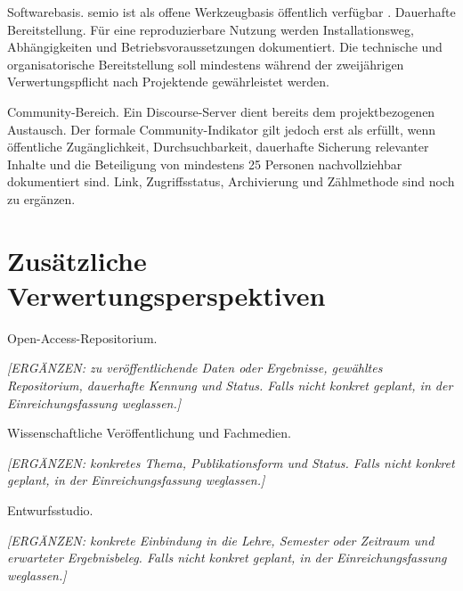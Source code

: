 \documentclass[type=zwischenbericht]{zukunftbau}
\begin{document}
Softwarebasis. semio ist als offene Werkzeugbasis öffentlich verfügbar \cite{saluz-semio-2025}.
Dauerhafte Bereitstellung. Für eine reproduzierbare Nutzung werden Installationsweg, Abhängigkeiten und Betriebsvoraussetzungen dokumentiert. Die technische und organisatorische Bereitstellung soll mindestens während der zweijährigen Verwertungspflicht nach Projektende gewährleistet werden.

Community-Bereich. Ein Discourse-Server dient bereits dem projektbezogenen Austausch. Der formale Community-Indikator gilt jedoch erst als erfüllt, wenn öffentliche Zugänglichkeit, Durchsuchbarkeit, dauerhafte Sicherung relevanter Inhalte und die Beteiligung von mindestens 25 Personen nachvollziehbar dokumentiert sind. Link, Zugriffsstatus, Archivierung und Zählmethode sind noch zu ergänzen.

\section{Zusätzliche Verwertungsperspektiven}

Open-Access-Repositorium.
\begin{Blockquote}
\textit{[ERGÄNZEN: zu veröffentlichende Daten oder Ergebnisse, gewähltes Repositorium, dauerhafte Kennung und Status. Falls nicht konkret geplant, in der Einreichungsfassung weglassen.]}
\end{Blockquote}

Wissenschaftliche Veröffentlichung und Fachmedien.
\begin{Blockquote}
\textit{[ERGÄNZEN: konkretes Thema, Publikationsform und Status. Falls nicht konkret geplant, in der Einreichungsfassung weglassen.]}
\end{Blockquote}

Entwurfsstudio.
\begin{Blockquote}
\textit{[ERGÄNZEN: konkrete Einbindung in die Lehre, Semester oder Zeitraum und erwarteter Ergebnisbeleg. Falls nicht konkret geplant, in der Einreichungsfassung weglassen.]}
\end{Blockquote}

\makeappendices
\end{document}
